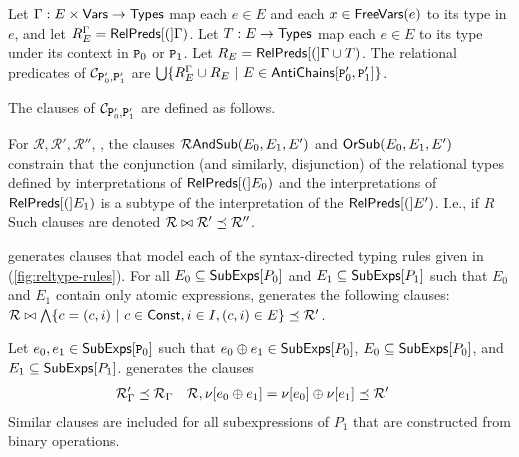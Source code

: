 Let $\Gamma : E \times \mathsf{Vars} \to \mathsf{Types}$ map each $e \in E$ and each
$x \in \mathsf{FreeVars}(e)$ to its type in $e$, and let $R_E^{\Gamma} =
\mathsf{RelPreds}[ ( ] \Gamma )$.
%
Let $T : E \to \mathsf{Types}$ map each $e \in E$ to its type under its
context in $\cc{P}_0$ or $\cc{P}_1$.
%
%
Let $R_E = \mathsf{RelPreds}[ ( ]\Gamma \cup T)$.
%
The relational predicates of $\mathcal{C}_{ \cc{P}_0', \cc{P}_1' }$
are $\bigunion \setformer{ R_E^{\Gamma} \union R_E }{ E \in
  \antichains{ \cc{P}_0' }{ \cc{P}_1' }}$.

The clauses of $\mathcal{C}_{ \cc{P}_0', \cc{P}_1' }$ are defined as
follows.
%

For $\mathcal{R}, \mathcal{R}', \mathcal{R}''$,
%
%
, the clauses $\mathcal{R}\mathsf{AndSub}(E_0, E_1, E')$ and $\mathsf{OrSub}(E_0, E_1,
E')$ constrain that the conjunction (and similarly, disjunction) of
the relational types defined by interpretations of $\mathsf{RelPreds}[ ( ]E_0)$
and the interpretations of $\mathsf{RelPreds}[ ( ]E_1)$ is a subtype of the
interpretation of the $\mathsf{RelPreds}[ ( ]E')$.
%
I.e., if $R$
%
%
Such clauses are denoted $\mathcal{R} \bowtie \mathcal{R}' \preceq
\mathcal{R}''$.


\verifybnd generates clauses that model each of the syntax-directed
typing rules given in (\autoref{fig:reltype-rules}).
For all $E_0 \subseteq \mathsf{SubExps}[  P_0  ]$ and $E_1 \subseteq \mathsf{SubExps}[ 
  P_1  ]$ such that $E_0$ and $E_1$ contain only atomic expressions,
\verifybnd generates the following clauses:
%
$\mathcal{R} \joinctr %
\bigland \setformer{ c = (c, i) }{ c \in \const, i \in I, (c, i) \in E
} \subtype \mathcal{R}'$.

Let $e_0, e_1 \in \subexps{ \cc{P}_0 }$ such that $e_0 \oplus e_1
\in \mathsf{SubExps}[  P_0  ]$, %
$E_0 \subseteq \mathsf{SubExps}[  P_0  ]$, and %
$E_1 \subseteq \mathsf{SubExps}[  P_1  ]$.
%
\verifybnd generates the clauses
\begin{align*}
  \mathcal{R}'_{\Gamma} & \subtype \mathcal{R}_{\Gamma} &
  \mathcal{R}, %
  \resvar{e_0 \oplus e_1} = \resvar{e_0} \oplus \resvar{e_1} &
  \subtype \mathcal{R}'
\end{align*}
%
%
Similar clauses are included for all subexpressions of $P_1$ that are
constructed from binary operations.

